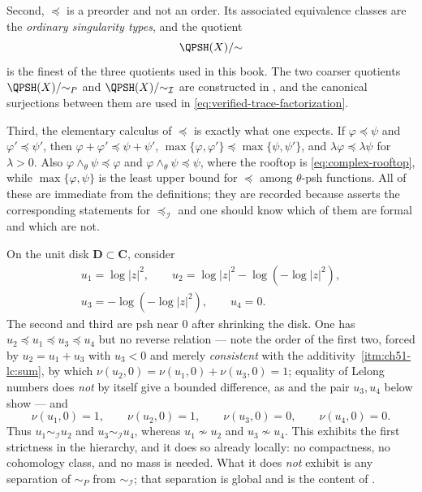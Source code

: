 Second, $\preceq$ is a preorder and not an order.  Its associated
equivalence classes are the \emph{ordinary singularity types}, and the
quotient
\[
 \QPSH(X)/{\sim}
\]
is the finest of the three quotients used in this book.  The two coarser
quotients $\QPSH(X)/{\sim_P}$ and $\QPSH(X)/{\sim_{\mathcal I}}$ are
constructed in , and the
canonical surjections between them are used in
\eqref{eq:verified-trace-factorization}.

Third, the elementary calculus of $\preceq$ is exactly what one expects.
If $\varphi\preceq\psi$ and $\varphi'\preceq\psi'$, then
$\varphi+\varphi'\preceq\psi+\psi'$,
$\max\{\varphi,\varphi'\}\preceq\max\{\psi,\psi'\}$, and
$\lambda\varphi\preceq\lambda\psi$ for $\lambda>0$.  Also
$\varphi\wedge_\theta\psi\preceq\varphi$ and
$\varphi\wedge_\theta\psi\preceq\psi$, where the rooftop is
\eqref{eq:complex-rooftop}, while
$\max\{\varphi,\psi\}$ is the least upper bound for $\preceq$ among
$\theta$-psh functions.  All of these are immediate from the
definitions; they are recorded because
 asserts the corresponding
statements for $\preceq_{\mathcal I}$ and one should know which of them
are formal and which are not.

\begin{example}
\label{ex:ch51-disk-three-types}
On the unit disk $\mathbf D\subset\mathbf C$, consider
\[
 \begin{gathered}
 u_1=\log|z|^2,
 \qquad
 u_2=\log|z|^2-\log(-\log|z|^2),\\
 u_3=-\log(-\log|z|^2),
 \qquad
 u_4=0 .
 \end{gathered}
\]
The second and third are psh near $0$ after shrinking the disk.  One has
$u_2\preceq u_1\preceq u_3\preceq u_4$ but no reverse relation --- note
the order of the first two, forced by $u_2=u_1+u_3$ with $u_3<0$ and
merely \emph{consistent} with the additivity
\,\cref{itm:ch51-lc:sum}, by which
$\nu(u_2,0)=\nu(u_1,0)+\nu(u_3,0)=1$; equality of Lelong numbers does
\emph{not} by itself give a bounded difference, as
 and the pair $u_3,u_4$ below show ---
and
\[
 \nu(u_1,0)=1,\qquad
 \nu(u_2,0)=1,\qquad
 \nu(u_3,0)=0,\qquad
 \nu(u_4,0)=0 .
\]
Thus $u_1\sim_{\mathcal I}u_2$ and $u_3\sim_{\mathcal I}u_4$, whereas
$u_1\not\sim u_2$ and $u_3\not\sim u_4$.  This exhibits the first
strictness in the hierarchy, and it does so already locally: no
compactness, no cohomology class, and no mass is needed.  What it does
\emph{not} exhibit is any separation of $\sim_P$ from
$\sim_{\mathcal I}$; that separation is global and is the content of
.
\end{example}

